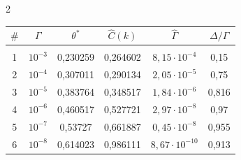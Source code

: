 \begin{multicols}{2}
\begin{table}[b]
\begin{center}

\vspace*{2ex}





\tabcolsep=8pt

\begin{tabular}{|c|c|c|c|c|c|}

\hline

$\#$ & $\Gamma$ & $\theta^*$ & $\hat{C}(k)$ & $\hat\Gamma $  & $\Delta/\Gamma$ \\

\hline 

&&&&&\\[-9pt]

1 & $10^{-3}$ & 0,230259 & 0,264602 & $8{,}15\cdot 10^{-4}$ & 0,15\hphantom{9}\\



2 &  $10^{-4}$ & 0,307011 &  0,290134 & $2{,}05\cdot 10^{-5}$  & 0,75\hphantom{9}\\



3 &  $10^{-5}$ & 0,383764 & 0,348517 & $1{,}84\cdot 10^{-6}$ &  0,816\\



4 &  $10^{-6}$ & 0,460517 & 0,527721 &  $2{,}97\cdot 10^{-8}$ & 0,97\hphantom{9}\\



5 &  $10^{-7}$ & 0,53727\hphantom{9} & 0,661887  &  $0{,}45\cdot 10^{-8}$ &  0,955\\



6 &  $10^{-8}$ & 0,614023 & 0,986111  &  \hphantom{$^0$}$8{,}67\cdot 10^{-10}$ & 0,913\\

\hline 

\end{tabular}


\end{center}
\end{table}
\end{multicols}

